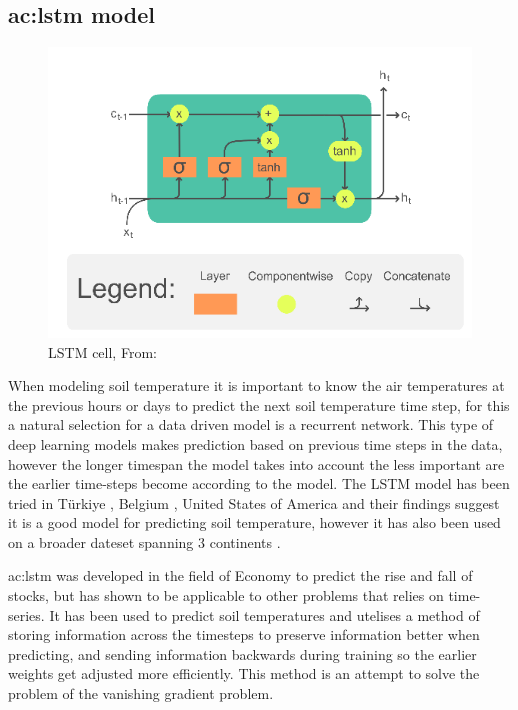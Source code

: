 \subsection{\acrfull{ac:lstm} model}\label{sec:theory:lstm}

\begin{figure}[ht]
	\centering
	\includegraphics[width=0.7\linewidth]{figures/LSTM_Cell}
	\caption{LSTM cell,  From: \textcite{chevalier_english_2018}}
	\label{fig:lstmcell}
\end{figure}
When modeling soil temperature it is important to know the air temperatures at the previous hours or days to predict the next soil temperature time step, for this a natural selection for a data driven model is a recurrent network. This type of deep learning models makes prediction based on previous time steps in the data, however the longer timespan the model takes into account the less important are the earlier time-steps become according to the model. The LSTM model has been tried in Türkiye \cite{uluocak_daily_2024}, Belgium \cite{elmaz_cnn-lstm_2021}, United States of America \cite{li_modeling_2020} and their findings suggest it is a good model for predicting soil temperature, however it has also been used on a broader dateset spanning 3 continents \cite{li_attention-aware_2022}.

\acrshort{ac:lstm}\cite{hochreiter_long_1997} was developed in the field of Economy to predict the rise and fall of stocks, but has shown to be applicable to other problems that relies on time-series. It has been used to predict soil temperatures\cite{citakoglu_comparison_2017,elmaz_cnn-lstm_2021,feng_estimation_2019,kandasamy_performance_2023,li_attention-aware_2022,li_gans-lstm_2020,li_modeling_2020,wang_modeling_2022,mehdizadeh_modelling_2020} and utelises a method of storing information across the timesteps to preserve information better when predicting, and sending information backwards during training so the earlier weights get adjusted more efficiently. This method is an attempt to solve the problem of the vanishing gradient problem.

